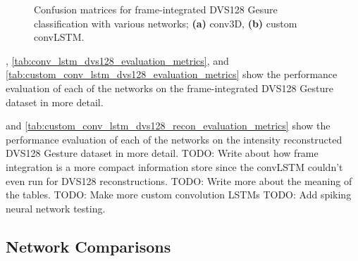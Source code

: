 \begin{figure}[htb]%
    \centering
    \qquad
    \caption{Confusion matrices for frame-integrated  DVS128 Gesure classification with various networks; \textbf{(a)} conv3D, \textbf{(b)} custom convLSTM.}%
    \label{fig:dvs128_recon_c_matrices}%
\end{figure}

, \cref{tab:conv_lstm_dvs128_evaluation_metrics}, and \cref{tab:custom_conv_lstm_dvs128_evaluation_metrics} show the performance evaluation of each of the networks on the frame-integrated DVS128 Gesture dataset in more detail.

 and \cref{tab:custom_conv_lstm_dvs128_recon_evaluation_metrics} show the performance evaluation of each of the networks on the intensity reconstructed DVS128 Gesture dataset in more detail. 
\color {red} TODO: Write about how frame integration is a more compact information store since the convLSTM couldn't even run for DVS128 reconstructions. \color{black}
\color{red} TODO: Write more about the meaning of the tables. \color{black}
\color{red} TODO: Make more custom convolution LSTMs \color{black}
\color{red} TODO: Add spiking neural network testing. \color{black}

\subsection{Network Comparisons}

